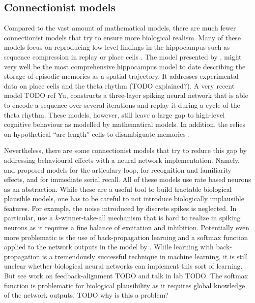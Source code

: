 \subsection{Connectionist models}
Compared to the vast amount of mathematical models, there are much fewer connectionist models that try to ensure more biological realism.
Many of these models focus on reproducing low-level findings in the hippocampus such as sequence compression in replay \parencite{Levy2005} or place cells \parencite{Milford2004}.
The model presented by \textcite{Hasselmo2012}, might very well be the most comprehensive hippocampus model to date describing the storage of episodic memories as a spatial trajectory.
It addresses experimental data on place cells and the theta rhythm (TODO explained?).
A very recent model TODO ref Yu, constructs a three-layer spiking neural network that is able to encode a sequence over several iterations and replay it during a cycle of the theta rhythm.
These models, however, still leave a large gap to high-level cognitive behaviour as modelled by mathematical models.
In addition, the \textcite{Hasselmo2012} relies on hypothetical ``arc length'' cells to disambiguate memories \parencite[cp.][]{Robins2014}.

Nevertheless, there are some connectionist models that try to reduce this gap by addressing behavioural effects with a neural network implementation.
Namely, \textcite{Burgess1992} and \textcite{Burgess1996} proposed models for the articulary loop, \textcite{Norman2003} for recognition and familiarity effects, and \textcite{Botvinick2006} for immediate serial recall.
All of these models use rate based neurons as an abstraction.
While these are a useful tool to build tractable biological plausible models, one has to be careful to not introduce biologically implausible features.
For example, the noise introduced by discrete spikes is neglected.
In particular, \textcite{Norman2003} use a $k$-winner-take-all mechanism that is hard to realize in spiking neurons as it requires a fine balance of excitation and inhibition.
Potentially even more problematic is the use of back-propagation learning and a softmax function applied to the network outputs in the model by \textcite{Botvinick2006}.
While learning with back-propagation is a tremendously successful technique in machine learning, it is still unclear whether biological neural networks can implement this sort of learning.
But see work on feedback-alignment TODO and talk in lab TODO\@.
The softmax function is problematic for biological plausibility as it requires global knowledge of the network outputs.
TODO why is this a problem?

